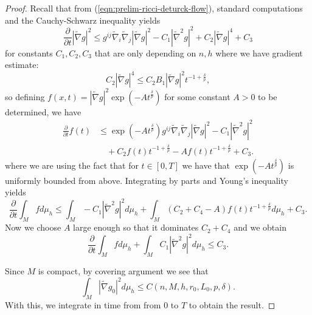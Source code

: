 \documentclass[12pt]{amsart}
\theoremstyle{plain}
\theoremstyle{plain}
\theoremstyle{definition}
\theoremstyle{remark}
\numberwithin{equation}{subsection}
\newcommand{\hdel}{\tilde{\nabla}}
\begin{document}
\begin{proof}
    Recall that from (\ref{eqn:prelim-ricci-deturck-flow}), standard computations and the Cauchy-Schwarz inequality yields
    \begin{equation*}
        \frac{\partial}{\partial t} |\hdel g|^2 \leq g^{ij}\hdel_i\hdel_j |\hdel g|^2 - C_1 |\hdel^2 g|^2 + C_2|\hdel g|^4 + C_3
    \end{equation*}
    for constants $C_1, C_2, C_3$ that are only depending on $n, h$ where we have gradient estimate:
    \begin{equation*}
        C_2|\hdel g|^4 \leq C_2B_1|\hdel g|^2t^{-1+\frac{\delta}{p}},
    \end{equation*}
    so defining $f(x,t) = |\hdel g|^2\exp\left(-At^\frac{\delta}{p}\right)$ for some constant $A > 0$ to be determined, we have
    \begin{align*}
        \frac{\partial}{\partial t} f(t) &\leq \exp\left(-At^\frac{\delta}{p}\right)g^{ij}\hdel_i\hdel_j|\hdel g|^2 - C_1|\hdel^2 g|^2 \nonumber \\
        &\quad + C_2f(t)t^{-1+\frac{\delta}{p}} - Af(t)t^{-1+\frac{\delta}{p}} + C_3.
    \end{align*}
    where we are using the fact that for $t \in [0, T]$ we have that $\exp\left(-At^\frac{\delta}{p}\right)$ is uniformly bounded from above. Integrating by parts and Young's inequality yields
    \begin{equation*}
        \frac{\partial}{\partial t} \int_M fd\mu_h \leq \int_M -C_1|\hdel^2g|^2d\mu_h + \int_M\left(C_2+C_4-A\right)f(t)t^{-1+\frac{\delta}{p}}d\mu_h + C_3.
    \end{equation*}
    Now we choose $A$ large enough so that it dominates $C_2 + C_4$ and we obtain
    \begin{equation*}
        \frac{\partial}{\partial t} \int_M fd\mu_h + \int_M C_1|\hdel^2 g|^2d\mu_h \leq C_3.
    \end{equation*}
    
Since $M$ is compact, by covering argument we see that 
\begin{equation}
\int_M |\tilde\nabla g_0|^2 d\mu_h \leq C(n,M,h,r_0,L_0,p,\delta).
\end{equation} 
With this, we integrate in time from from $0$ to $T$ to obtain the result.
\end{proof}
\end{document}
